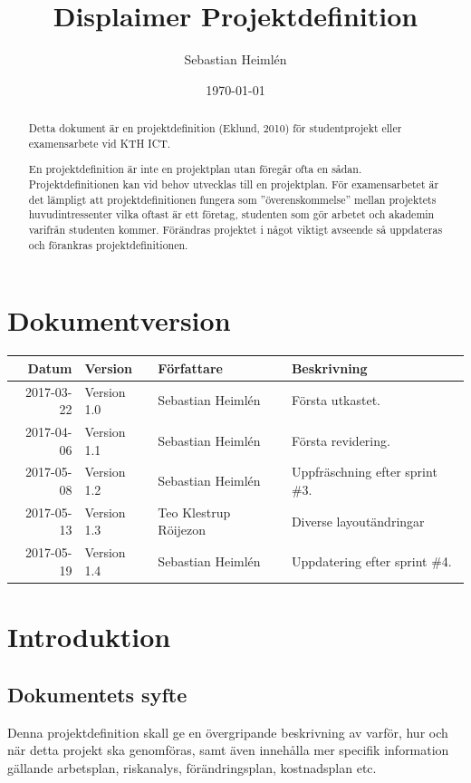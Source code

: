 \documentclass[11pt]{article}
\author{Sebastian Heimlén}
\date{\today}
\title{Displaimer Projektdefinition}
\begin{document}
\maketitle
\begin{abstract}
Detta dokument är en projektdefinition (Eklund, 2010) för studentprojekt eller examensarbete vid KTH ICT.

En projektdefinition är inte en projektplan utan föregår ofta en sådan. Projektdefinitionen kan
vid behov utvecklas till en projektplan. För examensarbetet är det lämpligt att projektdefinitionen
fungera som ”överenskommelse” mellan projektets huvudintressenter vilka oftast är ett företag, studenten
som gör arbetet och akademin varifrån studenten kommer. Förändras projektet i något viktigt avseende
så uppdateras och förankras projektdefinitionen.
\end{abstract}


\section*{Dokumentversion}
\label{sec:orgb90dacb}
\begin{center}
\begin{tabular}{rlll}
\textbf{Datum} & \textbf{Version} & \textbf{Författare} & \textbf{Beskrivning}\\
\hline
2017-03-22 & Version 1.0 & Sebastian Heimlén & Första utkastet.\\
2017-04-06 & Version 1.1 & Sebastian Heimlén & Första revidering.\\
2017-05-08 & Version 1.2 & Sebastian Heimlén & Uppfräschning efter sprint \#3.\\
2017-05-13 & Version 1.3 & Teo Klestrup Röijezon & Diverse layoutändringar\\
2017-05-19 & Version 1.4 & Sebastian Heimlén & Uppdatering efter sprint \#4.\\
\end{tabular}
\end{center}


\pagebreak
\setcounter{tocdepth}{4}
\tableofcontents

\section{Introduktion}
\label{sec:org4977f18}
\subsection{Dokumentets syfte}
\label{sec:org2cd1dd7}
Denna projektdefinition skall ge en övergripande beskrivning av varför,
hur och när detta projekt ska genomföras, samt även innehålla mer
specifik information gällande arbetsplan, riskanalys, förändringsplan,
kostnadsplan etc.
\end{document}
